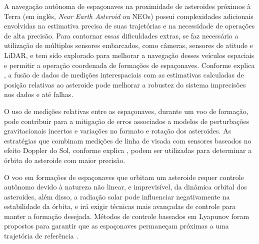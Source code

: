A navegação autônoma de espaçonaves na proximidade de asteroides próximos à Terra (em inglês, \textit{Near Earth Asteroid} ou NEOs) possui complexidades adicionais envolvidas na estimativa precisa de suas trajetórias e na necessidade de operações de alta precisão. Para contornar essas dificuldades extras, se faz necessário a utilização de múltiplos sensores embarcados, como câmeras, sensores de atitude e LiDAR, e tem sido explorado para melhorar a navegação desses veículos espaciais e permitir a operação coordenada de formações de espaçonaves. Conforme explica \cite{vetrisano2015autonomous}, a fusão de dados de medições interespaciais com as estimativas calculadas de posição relativas ao asteroide pode melhorar a robustez do sistema imprecisões nos dados e até falhas.

O uso de medições relativas entre as espaçonaves, durante um voo de formação, pode contribuir para a mitigação de erros associados a modelos de perturbações gravitacionais incertos e variações no formato e rotação dos asteroides. As estratégias que combinam medições de linha de visada com sensores baseados no efeito Doppler do Sol, conforme explica \cite{yim2000autonomous}, podem ser utilizadas para determinar a órbita do asteroide com maior precisão.

O voo em formações de espaçonaves que orbitam um asteroide requer controle autônomo devido à natureza não linear, e imprevisível, da dinâmica orbital dos asteroides, além disso, a radiação solar pode influenciar negativamente na estabilidade da órbita, e irá exigir técnicas mais avançadas de controle para manter a formação desejada. Métodos de controle baseados em Lyapunov foram propostos para garantir que as espaçonaves permaneçam próximas a uma trajetória de referência \cite{vetrisano2015autonomous}.


